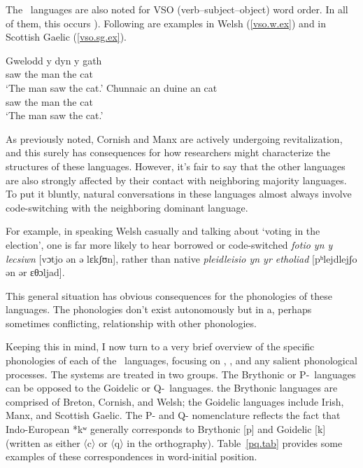 \documentclass[output=paper,colorlinks,citecolor=brown]{langscibook}
\begin{document}
The \ce\ languages are also noted for VSO (verb--subject--object) word order. In all of them, this occurs ). Following are examples in Welsh (\ref{vso.w.ex}) and in Scottish Gaelic (\ref{vso.sg.ex}).

\ea\label{vso.w.ex}
\gll Gwelodd y   dyn  y  gath \\
     saw     the man the cat \\
\glt `The man saw the cat.'
\ex\label{vso.sg.ex}
\gll Chunnaic an  duine an  cat \\
     saw      the man   the cat \\
\glt `The man saw the cat.'
\z

As previously noted, Cornish and Manx are actively undergoing revitalization, and this surely has consequences for how researchers might characterize the structures of these languages. However, it's fair to say that the other languages are also strongly affected by their contact with neighboring majority languages. To put it bluntly, natural conversations in these languages almost always involve code-switching  with the neighboring dominant language.

For example, in speaking Welsh casually and talking about `voting in the election', one is far more likely to hear borrowed or code-switched \emph{fotio yn y lecsiwn} [vɔtjo ən ə lɛkʃʊn], rather than native \emph{pleidleisio yn yr etholiad} [pʰlejdlejʃo ən ər ɛθɔljad].

This general situation has obvious consequences for the phonologies of these languages. The phonologies don't exist autonomously but in a, perhaps sometimes conflicting, relationship with other phonologies. 

Keeping this in mind, I now turn to a very brief overview of the specific phonologies of each of the \ce\ languages, focusing on , \m{}, and any salient phonological processes. The systems are treated in two groups. The Brythonic or P-\ce\ languages can be opposed to the Goidelic or Q-\ce\ languages.  the Brythonic languages are comprised of Breton, Cornish, and Welsh; the Goidelic languages include Irish, Manx, and Scottish Gaelic. The P- and Q- nomenclature reflects the fact that Indo-European *kʷ generally corresponds to Brythonic [p] and Goidelic [k] (written as either 〈c〉 or 〈q〉 in the orthography). Table~\ref{pq.tab} provides some examples of these correspondences in word-initial position.
\end{document}
